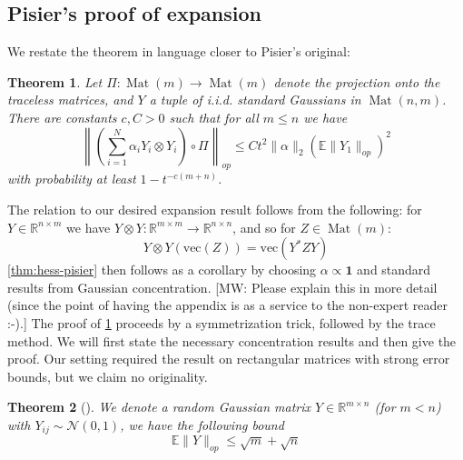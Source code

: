 \documentclass[aos]{imsart}
\newtheorem{theorem}{Theorem}[section]
\theoremstyle{definition}
\numberwithin{equation}{section}
\DeclareMathOperator{\mat}{Mat}
\newcommand{\R}{{\mathbb{R}}}
\renewcommand{\vec}{\bm}
\newcommand{\E}{\mathbb{E}}
\newcommand{\samp}{x}
\newcommand{\MW}[1]{{\color{red}[MW: #1]}}
\begin{document}
\begin{appendix}




\section{Pisier's proof of expansion}\label{sec:pisier}
We restate the theorem in language closer to Pisier's original:

\begin{theorem}\label{thm:Pisier-expansion}
Let $\Pi: \mat(m) \to \mat(m)$ denote the projection onto the traceless matrices, and $Y$ a tuple of i.i.d. standard Gaussians in $\mat(n,m)$. There are constants $c,C > 0$ such that for all $m \leq n$ we have
\[ \left\| \left(\sum_{i=1}^{N} \alpha_{i} Y_{i} \otimes Y_{i}\right) \circ \Pi \right\|_{op} \leq C t^{2} \|\alpha\|_{2} \left( \E \|Y_1\|_{op} \right)^{2} \]
with probability at least $ 1- t^{-c(m+n)}$.
\end{theorem}

The relation to our desired expansion result follows from the following: for $Y \in \R^{n \times m}$ we have $Y \otimes Y : \R^{m \times m} \to \R^{n \times n}$, and so for $Z \in \mat(m)$:
\[ Y \otimes Y (\text{vec}(Z)) = \text{vec}( Y^{*} Z Y)      \]
\cref{thm:hess-pisier} then follows as a corollary by choosing $\alpha \propto \vec{1}$ and standard results from Gaussian concentration.
\MW{Please explain this in more detail (since the point of having the appendix is as a service to the non-expert reader :-).}
The proof of \cref{thm:Pisier-expansion} proceeds by a symmetrization trick, followed by the trace method. We will first state the necessary concentration results and then give the proof. Our setting required the result on rectangular matrices with strong error bounds, but we claim no originality.

\begin{theorem}[\cite{P86}]
We denote a random Gaussian matrix $Y \in \R^{m \times n}$ (for $m < n$) with $Y_{ij} \sim \mathcal{N}(0,1)$, we have the following bound
\[ \E \|Y\|_{op} \leq \sqrt{m} + \sqrt{n} \]
\end{theorem}



\end{appendix}
\end{document}
